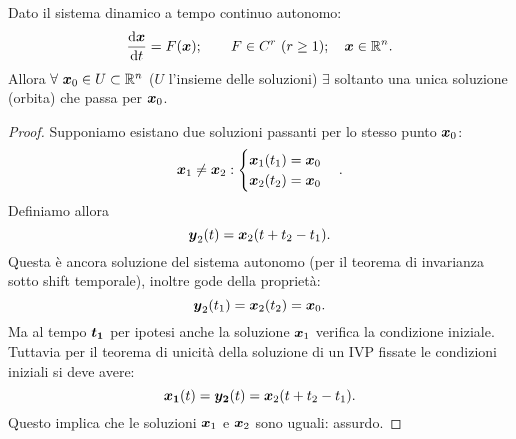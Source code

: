 \noindent
\begin{thm}
    Dato il sistema dinamico a tempo continuo autonomo:
    \[
	\frac{\text{d} \boldsymbol{x}}{\text{d} t} = F(\boldsymbol{x}); \qquad F \in C^r \ (r\ge 1); \quad \boldsymbol{x}\in\mathbb{R}^n
    .\] 
    Allora $\forall \ \boldsymbol{x}_0 \in U \subset \mathbb{R}^n$ ($U$ l'insieme delle soluzioni) $\exists$ soltanto una unica soluzione (orbita) che passa per $\boldsymbol{x}_0$.
\end{thm}
\begin{proof}
    Supponiamo esistano due soluzioni passanti per lo stesso punto $\boldsymbol{x}_0$:
    \[
        \boldsymbol{x}_1 \neq \boldsymbol{x}_2: 
	\begin{cases}
	    \boldsymbol{x}_1(t_1)=\boldsymbol{x}_0\\
	    \boldsymbol{x}_2(t_2)=\boldsymbol{x}_0
	\end{cases}
    .\] 
    Definiamo allora 
    \[
	\boldsymbol{y}_2(t)=\boldsymbol{x}_2(t+t_2-t_1)
    .\] 
    Questa è ancora soluzione del sistema autonomo (per il teorema di invarianza sotto shift temporale), inoltre gode della proprietà:
    \[
	\boldsymbol{y}_2(t_1)=\boldsymbol{x}_2(t_2)=\boldsymbol{x}_0
    .\] 
    Ma al tempo $\boldsymbol{t_1}$ per ipotesi anche la soluzione $\boldsymbol{x}_1$ verifica la condizione iniziale.\\
    Tuttavia per il teorema di unicità della soluzione di un IVP fissate le condizioni iniziali si deve avere:
    \[
	\boldsymbol{x_1} (t)=\boldsymbol{y_2} (t) = \boldsymbol{x}_2(t+t_2-t_1)
    .\] 
    Questo implica che le soluzioni $\boldsymbol{x}_1$ e $\boldsymbol{x}_2$ sono uguali: assurdo.
\end{proof}
\noindent
